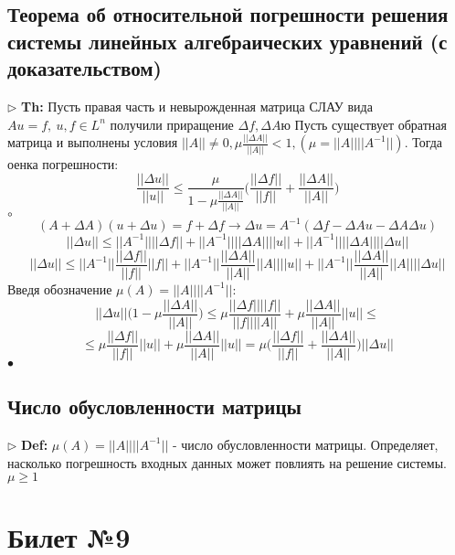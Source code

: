 \documentclass[a4paper]{article}
\begin{document}
\subsection{Теорема об относительной погрешности решения системы линейных алгебраических уравнений (с доказательством)}
$\triangleright$ \textbf{Th:} Пусть правая часть и невырожденная матрица СЛАУ вида $Au=f,\ u,f \in L^n$ получили приращение $\Delta f, \Delta A$ю Пусть существует обратная матрица и выполнены условия $||A|| \neq 0, \mu \frac{||\Delta A||}{||A||} < 1, (\mu=||A|| ||A^{-1}||)$. Тогда оенка погрешности:
$$ \frac{||\Delta u||}{||u||} \leq \frac{\mu}{1-\mu \frac{||\Delta A||}{||A||}} \bigg( \frac{||\Delta f||}{||f||} + \frac{||\Delta A||}{||A||} \bigg)$$
	$\circ$ 
		$$ (A + \Delta A)(u+\Delta u)=f+\Delta f \rightarrow \Delta u = A^{-1}(\Delta f - \Delta Au - \Delta A \Delta u)$$
		$$ ||\Delta u|| \leq ||A^{-1}|| ||\Delta f|| + ||A^{-1}|| ||\Delta A|| ||u|| + ||A^{-1}|| ||\Delta A|| ||\Delta u|| $$
		$$ ||\Delta u|| \leq ||A^{-1}|| \frac{||\Delta f||}{||f||} ||f|| + ||A^{-1}|| \frac{||\Delta A||}{||A||} ||A|| ||u|| + ||A^{-1}|| \frac{||\Delta A||}{||A||} ||A|| ||\Delta u||  $$
		Введя обозначение $\mu (A)=||A|| ||A^{-1}||$:
		$$ ||\Delta u || \big( 1- \mu \frac{||\Delta A||}{||A||} \big) \leq \mu \frac{||\Delta f|| ||f||}{||f|| ||A||} + \mu \frac{||\Delta A||}{||A||} ||u|| \leq $$
		$$ \leq \mu \frac{||\Delta f||}{||f||} ||u|| + \mu \frac{||\Delta A||}{||A||}||u|| = \mu \bigg( \frac{||\Delta f||}{||f||} + \frac{||\Delta A||}{||A||} \bigg) ||\Delta u||$$
	$\bullet$

\subsection{Число обусловленности матрицы}
$\triangleright$ \textbf{Def:} $\mu(A) = ||A|| ||A^{-1}||$ - число обусловленности матрицы. Определяет, насколько погрешность входных данных может повлиять на решение системы. $\mu \geq 1$

\section{Билет №9}
\end{document}
